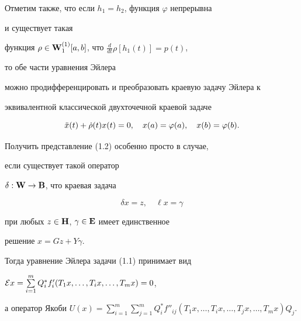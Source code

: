 Отметим также, что если $h_1=h_2$, функция $\varphi$ непрерывна


и существует такая


функция $\rho\in\bold W{}_1^{(1)}[a,b]$, что $\frac d{dt}\rho[h_1(t)]=p(t)$,


то обе части уравнения Эйлера


можно продифференцировать и преобразовать краевую задачу Эйлера к


эквивалентной классической двухточечной краевой задаче


$$


\Ddot x(t)+\Dot\rho(t)x(t)=0,\quad


x(a)=\varphi(a),\quad x(b)=\varphi(b).


$$





Получить представление (1.2) особенно просто в случае,


если существует такой оператор


$\delta:\bold W{}\to\bold B{}$, что краевая задача


$$


\delta x=z,\quad \ell x=\gamma


$$


при любых $z\in\bold H{}$, $\gamma\in\bold E{}$ имеет единственное


решение $x=Gz+Y\gamma$.


Тогда уравнение Эйлера задачи (1.1) принимает вид


${\cal E}x=\sum\limits_{i=1}^mQ_i^*f'_i(T_1x,\dotsc,T_ix,\dotsc,T_mx)=0$,


а оператор Якоби $U(x)=\sum\limits_{i=1}^m\sum\limits_{j=1}^m


Q_i^*f''_{ij}(T_1x,\dotsc,T_ix,\dotsc,T_jx,\dotsc,T_mx)Q_j$.





